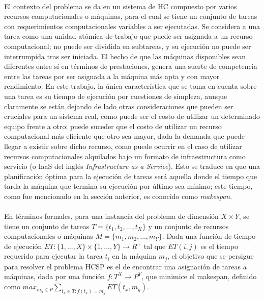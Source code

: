 \paragraph{}El contexto del problema se da en un sistema de HC compuesto por varios recursos computacionales o máquinas, para el cual se tiene un conjunto de tareas con requerimientos computacionales variables a ser ejecutadas.
Se considera a una tarea como una unidad atómica de trabajo que puede ser asignada a un recurso computacional; no puede ser dividida en subtareas, y su ejecución no puede ser interrumpida tras ser iniciada.
El hecho de que las máquinas disponibles sean diferentes entre sí en términos de prestaciones, genera una suerte de competencia entre las tareas por ser asignada a la máquina más apta y con mayor rendimiento.
En este trabajo, la única característica que se toma en cuenta sobre una tarea es su tiempo de ejecución por cuestiones de simpleza, aunque claramente se están dejando de lado otras consideraciones que pueden ser cruciales para un sistema real, como puede ser el costo de utilizar un determinado equipo frente a otro; puede suceder que el costo de utilizar un recurso computacional más eficiente que otro sea mayor, dada la demanda que puede llegar a existir sobre dicho recurso, como puede ocurrir en el caso de utilizar recursos computacionales alquilados bajo un formato de infraestructura como servicio (o IaaS del inglés \textit{Infrastructure as a Service}). 
Esto se traduce en que una planificación óptima para la ejecución de tareas será aquella donde el tiempo que tarda la máquina que termina su ejecución por último sea mínimo; este tiempo, como fue mencionado en la sección anterior, es conocido como \textit{makespan}.

\paragraph{}En términos formales, para una instancia del problema de dimensión $X\times Y$, se tiene un conjunto de tareas $T = \{t_1,t_2,\dots,t_X\}$ y un conjunto de recursos computacionales o máquinas $M = \{m_1,m_2,\dots,m_Y \}$. Dada una función de tiempo de ejecución $ET : \{1,\dots,X\} \times \{1,\dots,Y\} \rightarrow R^+$ tal que $ET(i,j)$ es el tiempo requerido para ejecutar la tarea $t_i$ en la máquina $m_j$, el objetivo que se persigue para resolver el problema HCSP es el de encontrar una asignación de tareas a máquinas, dada por una función $f: T^X \rightarrow P^Y$, que minimice el makespan, definido como $max_{m_y \in P} \sum_{t_x \in T: f(t_x)=m_y} ET(t_x, m_y)$.

